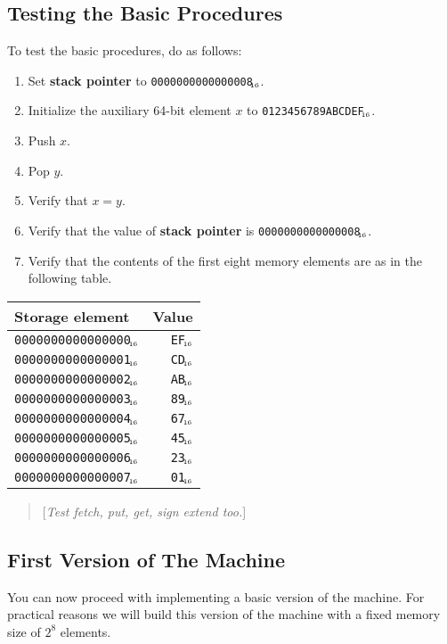 \documentclass[a4paper,12pt]{article}
\newcommand{\num}[1]{\texttt{#1}\xspace}
\newcommand{\hex}[1]{\num{#1}$_{\textup{\tiny\hskip-1ex 16}}$\xspace}
\newcommand{\SP}{\textbf{stack pointer}\xspace}
\newcommand{\comment}[1]{\begin{quote}[\textit{#1}]\end{quote}}
\begin{document}
\subsection{Testing the Basic Procedures}

To test the basic procedures, do as follows:
\begin{enumerate}
\item Set \SP to \hex{0000000000000008}.
\item Initialize the auxiliary 64-bit element $x$ to \hex{0123456789ABCDEF}.
\item Push $x$.
\item Pop $y$.
\item Verify that $x=y$.
\item Verify that the value of \SP is \hex{0000000000000008}.
\item Verify that the contents of the first eight memory elements are as in the following table.
\end{enumerate}

\begin{center}
  \begin{tabular}{@{}lr@{}}
    \hline
    Storage element        & Value    \\
    \hline
    \hex{0000000000000000} & \hex{EF} \\
    \hex{0000000000000001} & \hex{CD} \\
    \hex{0000000000000002} & \hex{AB} \\
    \hex{0000000000000003} & \hex{89} \\
    \hex{0000000000000004} & \hex{67} \\
    \hex{0000000000000005} & \hex{45} \\
    \hex{0000000000000006} & \hex{23} \\
    \hex{0000000000000007} & \hex{01} \\
    \hline
  \end{tabular}
\end{center}

\comment{Test fetch, put, get, sign extend too.}

\subsection{First Version of The Machine}

You can now proceed with implementing a basic version of the machine.
For practical reasons we will build this version of the machine with a fixed memory size of $2^{8}$ elements.
\end{document}
